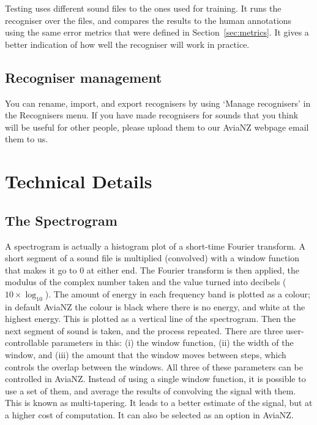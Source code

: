 \documentclass{article}
\begin{document}
Testing uses different sound files to the ones used for training. It runs the recogniser over the files, and compares the results to the human annotations using the same error metrics that were defined in Section~\ref{sec:metrics}. It gives a better indication of how well the recogniser will work in practice. %

\subsection{Recogniser management}\label{sec:filters}

You can rename, import, and export recognisers by using `Manage recognisers' in the Recognisers menu. If you have made recognisers for sounds that you think will be useful for other people, please upload them to our AviaNZ webpage email them to us. 
   
%
%
%
\section{Technical Details}

\subsection{The Spectrogram}\label{sec:spectrogram}

A spectrogram is actually a histogram plot of a short-time Fourier transform. A short segment of a sound file is multiplied (convolved) with a window function that makes it go to 0 at either end. The Fourier transform is then applied, the modulus  of the complex number taken and the value turned into decibels ($10 \times \log_10$). The amount of energy in each frequency band is plotted as a colour; in default AviaNZ the colour is black where there is no energy, and white at the highest energy. This is plotted as a vertical line of the spectrogram. Then the next segment of sound is taken, and the process repeated. There are three user-controllable parameters in this: (i) the window function, (ii) the width of the window, and (iii) the amount that the window moves between steps, which controls the overlap between the windows. All three of these parameters can be controlled in AviaNZ. Instead of using a single window function, it is possible to use a set of them, and average the results of convolving the signal with them. This is known as multi-tapering. It leads to a better estimate of the signal, but at a higher cost of computation. It can also be selected as an option in AviaNZ.
\end{document}
